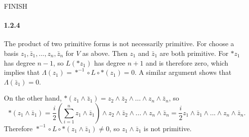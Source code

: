 \documentclass[10pt,letter]{article}
\begin{document}
FINISH

\paragraph*{1.2.4} The product of two primitive forms is not necessarily primitive. For choose a basis $z_1,\bar{z}_1,...,z_n,\bar{z}_n$ for $V$ as above. Then $z_1$ and $\bar{z}_1$ are both primitive. For $\ast z_1$ has degree $n-1$, so $L(\ast z_1)$ has degree $n+1$ and is therefore zero, which implies that $\Lambda(z_1) = \ast^{-1} \circ L \circ \ast(z_1) = 0$. A similar argument shows that $\Lambda(\bar{z}_1) = 0$. 

On the other hand, $\ast (z_1 \wedge \bar{z}_1) = z_2 \wedge \bar{z}_2 \wedge ... \wedge z_n \wedge \bar{z}_n$, so 
\[ \ast (z_1 \wedge \bar{z}_1) = \frac{i}{2} (\sum_{i=1}^n z_1 \wedge \bar{z}_1) \wedge z_2 \wedge \bar{z}_2 \wedge ... \wedge z_n \wedge \bar{z}_n = \frac{i}{2} z_1 \wedge \bar{z}_1 \wedge ... \wedge z_n \wedge \bar{z}_n.\] 
Therefore $\ast^{-1} \circ L \circ \ast(z_1 \wedge \bar{z}_1) \neq 0$, so $z_1 \wedge \bar{z}_1$ is not primitive. 
\end{document}
